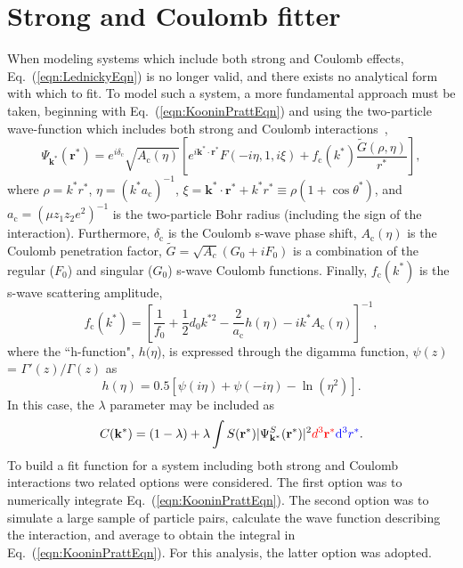 \documentclass[ALICE,manyauthors]{cernphprep}
\begin{document}
\section{Strong and Coulomb fitter}
\label{App:CoulombFitter}

When modeling systems which include both strong and Coulomb effects, Eq.~(\ref{eqn:LednickyEqn}) is no longer valid, and there exists no analytical form with which to fit.
To model such a system, a more fundamental approach must be taken, beginning with Eq.~(\ref{eqn:KooninPrattEqn}) and using the two-particle wave-function which includes both strong and Coulomb interactions~\cite{Lednicky:2005tb},
\begin{equation}
 \Psi_{\mathbf{k^{*}}}(\mathbf{r^{*}}) = e^{i\delta_{\mathrm{c}}}\sqrt{A_{\mathrm{c}}(\eta)}[e^{i\mathbf{k^{*}} \cdot \mathbf{r^{*}}}F(-i\eta,1,i\xi) + f_{\mathrm{c}}(k^{*})\frac{\tilde{G}(\rho,\eta)}{r^{*}}],
\label{eqn:CoulombWaveFcn}
\end{equation}
where $\rho = k^{*}r^{*}$, $\eta = (k^{*}a_{\mathrm{c}})^{-1}$, $\xi = \mathbf{k^{*}} \cdot \mathbf{r^{*}} + k^{*}r^{*} \equiv \rho(1+\cos\theta^{*})$, and $a_{\mathrm{c}} = (\mu z_{1}z_{2}e^{2})^{-1}$ is the two-particle Bohr radius (including the sign of the interaction).  
Furthermore, $\delta_{\mathrm{c}}$ is the Coulomb s-wave phase shift, $A_{\mathrm{c}}(\eta)$ is the Coulomb penetration factor, $\tilde{G} = \sqrt{A_{c}}(G_{0} + iF_{0})$ is a combination of the regular ($F_{0}$) and singular ($G_{0}$) s-wave Coulomb functions.  
Finally, $f_{\mathrm{c}}(k^{*})$ is the s-wave scattering amplitude,
\begin{equation}
 f_{\mathrm{c}}(k^{*}) = \left[\frac{1}{f_{0}} + \frac{1}{2}d_{0}k^{*2} - \frac{2}{a_{\mathrm{c}}}h(\eta) - ik^{*}A_{\mathrm{c}}(\eta)\right]^{-1},
\label{eqn:CoulombScattAmp}
\end{equation}
where the ``h-function", $h(\eta$), is expressed through the digamma function, $\psi(z)$ = $\Gamma'(z)/\Gamma(z)$ as
\begin{equation}
 h(\eta) = 0.5[\psi(i\eta) + \psi(-i\eta) - \ln(\eta^{2})].
\label{eqn:LednickyHFunction}
\end{equation} 
In this case, the $\lambda$ parameter may be included as
\begin{equation}
 C(\mathbf{k^{*}}) = (1 - \lambda) + \lambda\int S(\mathbf{r^{*}})|\Psi^{S}_{\mathbf{k^{*}}}(\mathbf{r^{*}})|^{2}{\color{red}d^{3}\mathbf{r^{*}}}{\color{blue}\mathrm{d}^{3}r^{*}}.
\label{eqn:GenCfEqnwLambda}
\end{equation}
To build a fit function for a system including both strong and Coulomb interactions two related options were considered. 
The first option was to numerically integrate Eq.~(\ref{eqn:KooninPrattEqn}).  
The second option was to simulate a large sample of particle pairs, calculate the wave function describing the interaction, and average to obtain the integral in Eq.~(\ref{eqn:KooninPrattEqn}). 
For this analysis, the latter option was adopted.
\end{document}
